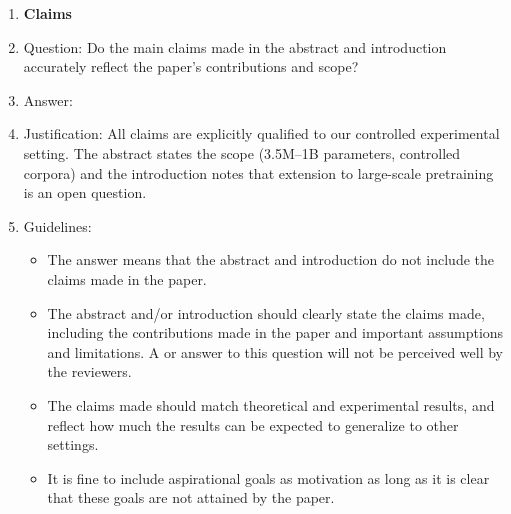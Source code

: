 \documentclass{article}
\begin{document}
\begin{enumerate}

\item {\bf Claims}
    \item[] Question: Do the main claims made in the abstract and introduction accurately reflect the paper's contributions and scope?
    \item[] Answer: \answerYes{}
    \item[] Justification: All claims are explicitly qualified to our controlled experimental setting. The abstract states the scope (3.5M--1B parameters, controlled corpora) and the introduction notes that extension to large-scale pretraining is an open question.
    \item[] Guidelines:
    \begin{itemize}
        \item The answer \answerNA{} means that the abstract and introduction do not include the claims made in the paper.
        \item The abstract and/or introduction should clearly state the claims made, including the contributions made in the paper and important assumptions and limitations. A \answerNo{} or \answerNA{} answer to this question will not be perceived well by the reviewers.
        \item The claims made should match theoretical and experimental results, and reflect how much the results can be expected to generalize to other settings.
        \item It is fine to include aspirational goals as motivation as long as it is clear that these goals are not attained by the paper.
    \end{itemize}


\end{enumerate}
\end{document}
